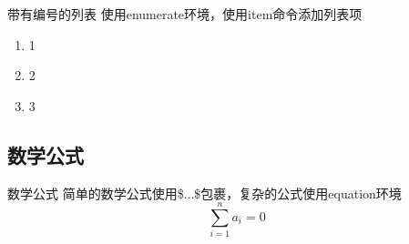 \begin{frame}{带有编号的列表}
    使用enumerate环境，使用item命令添加列表项
    \begin{enumerate}
        \item 1
        \item 2
        \item 3
    \end{enumerate}
\end{frame}

\subsection{数学公式}
\begin{frame}{数学公式}
    简单的数学公式使用\$...\$包裹，复杂的公式使用equation环境
    \begin{equation}
        \label{eq:1}
        \sum_{i=1}^n a_i=0
    \end{equation}
\end{frame}